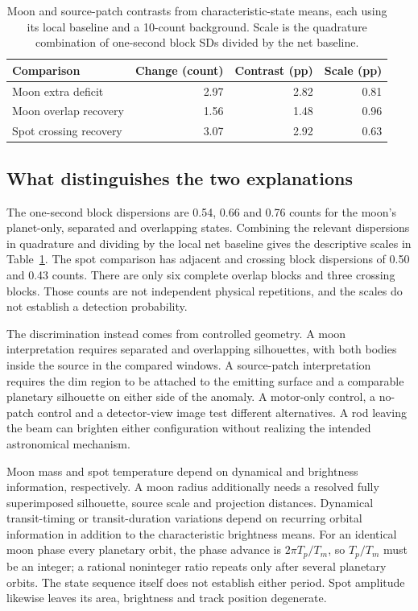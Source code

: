 \begin{table}[t]
\caption{Moon and source-patch contrasts from characteristic-state means, each using its local baseline and a 10-count background. Scale is the quadrature combination of one-second block SDs divided by the net baseline.}
\label{tab:trc-brightenings}
\centering\footnotesize\setlength{\tabcolsep}{3pt}
\begin{tabular}{@{}lrrr@{}}\toprule
Comparison & Change (count)&Contrast (pp)&Scale (pp)\\\midrule
Moon extra deficit&2.97&2.82&0.81\\
Moon overlap recovery&1.56&1.48&0.96\\
Spot crossing recovery&3.07&2.92&0.63\\\bottomrule
\end{tabular}
\end{table}

\subsection{What distinguishes the two explanations}
The one-second block dispersions are 0.54, 0.66 and 0.76 counts for the moon's planet-only, separated and overlapping states. Combining the relevant dispersions in quadrature and dividing by the local net baseline gives the descriptive scales in Table~\ref{tab:trc-brightenings}. The spot comparison has adjacent and crossing block dispersions of 0.50 and 0.43 counts. There are only six complete overlap blocks and three crossing blocks. Those counts are not independent physical repetitions, and the scales do not establish a detection probability.

The discrimination instead comes from controlled geometry. A moon interpretation requires separated and overlapping silhouettes, with both bodies inside the source in the compared windows. A source-patch interpretation requires the dim region to be attached to the emitting surface and a comparable planetary silhouette on either side of the anomaly. A motor-only control, a no-patch control and a detector-view image test different alternatives. A rod leaving the beam can brighten either configuration without realizing the intended astronomical mechanism.

Moon mass and spot temperature depend on dynamical and brightness information, respectively. A moon radius additionally needs a resolved fully superimposed silhouette, source scale and projection distances. Dynamical transit-timing or transit-duration variations depend on recurring orbital information in addition to the characteristic brightness means. For an identical moon phase every planetary orbit, the phase advance is $2\pi T_p/T_m$, so $T_p/T_m$ must be an integer; a rational noninteger ratio repeats only after several planetary orbits. The state sequence itself does not establish either period. Spot amplitude likewise leaves its area, brightness and track position degenerate.

